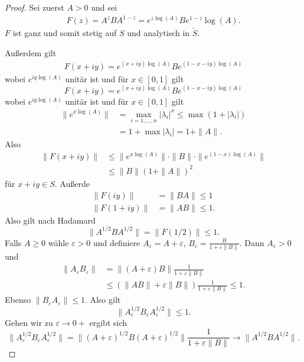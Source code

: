 \documentclass[
paper=a4,
bibtotocnumbered,
liststotocnumbered,
tablecaptionabove,
pointlessnumbers,
twoside,
openright,
10pt
]
{report}
\theoremstyle{definition}
\numberwithin{equation}{chapter}
\begin{document}
\begin{proof}
Sei zuerst $A>0$ und sei
\begin{align*}
F(z) = A^z B A^{1-z}= e^{z\log(A)} B e^{1-z} \log(A).
\end{align*}
$F$ ist ganz und somit stetig auf $S$ und analytisch in $\mathring S$.

Außerdem gilt
\begin{align*}
F(x+iy) = e^{(x+iy) \log(A)} B e^{(1-x-iy) \log(A)}
\end{align*}
wobei $e^{iy\log(A)}$ unitär ist und für $x\in [0,1]$ gilt 
\begin{equation}
F(x+iy) =e^{(x+iy) \log(A)} B e^{(1-x-iy) \log(A)}
\end{equation}
wobei $e^{iy\log(A)}$ unitär ist und für $x\in [0,1]$ gilt
\begin{align*}
\| e^{x\log(A)} \| &= \max_{i=1,\ldots,n} |\lambda_i |^x \le \max (1+ |\lambda_i|) \\
&= 1+\max|\lambda_i| = 1 + \| A\|.
\end{align*}
Also
\begin{align*}
\| F(x+iy)\| &\le \| e^{x\log(A)} \| \cdot \| B \| \cdot \| e^{(1-x) \log(A)}\|\\
&\le  \| B\| (1+\|A\|)^2
\end{align*}
für $x+iy \in S$. Außerde
\begin{align*}
\| F(iy) \| &= \| BA\| \le 1\\
\| F(1+iy)\| &= \|AB\| \le 1.
\end{align*}
Also gilt nach Hadamard
\begin{equation}
\| A^{1/2} B A^{1/2} \| = \| F(1/2)\| \le 1.
\end{equation}
Falls $A\ge 0$ wähle $\varepsilon >0$ und definiere $A_{\varepsilon} = A+\varepsilon$, $B_\varepsilon = \frac{B}{1+\varepsilon \| B\|}$. Dann $A_{\varepsilon} >0$ und
\begin{align*}
\| A_{\varepsilon} B_\varepsilon \| &= \| (A+\varepsilon) B\| \frac{1}{1+\varepsilon \| B\|} \\
&\le ( \| AB \| + \varepsilon \| B\| ) \frac{1}{1+\varepsilon \| B\|} \le 1.
\end{align*}
Ebenso $\| B_\varepsilon A_\varepsilon\| \le 1$. Also gilt
\begin{equation}
\| A_\varepsilon^{1/2} B_\varepsilon A_\varepsilon^{1/2}\| \le 1.
\end{equation}
Gehen wir zu $\varepsilon \to 0+$ ergibt sich
\begin{equation}
\| A_{\varepsilon}^{1/2} B_\varepsilon A_\varepsilon^{1/2}\| = \| (A+\varepsilon)^{1/2} B (A+\varepsilon)^{1/2} \| \frac{1}{1+\varepsilon \| B\|} \to \| A^{1/2} B A^{1/2} \|.
\end{equation}


\end{proof}
\end{document}
